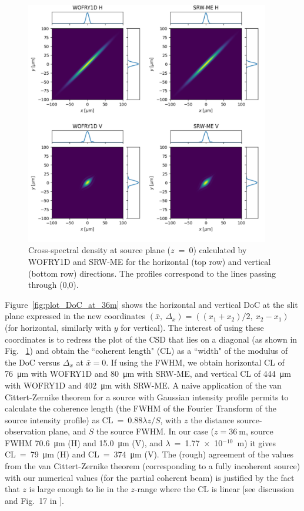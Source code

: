 \documentclass{iucr}              %
\begin{document}
\begin{figure}
    \label{fig:plot_CSD_at_source}
    \includegraphics[width=0.95\textwidth]{figures/plot_CSD_at_source.pdf}
    \caption{Cross-spectral density at source plane ($z$~=~0) calculated by WOFRY1D and SRW-ME for the horizontal (top row) and vertical (bottom row) directions.
    The profiles correspond to the lines passing through (0,0).
    }
\end{figure}

Figure~\ref{fig:plot_DoC_at_36m} shows the horizontal and vertical DoC at the slit plane expressed in the new coordinates $(\bar{x},~\Delta_x) = ((x_1+x_2)\big/2,~x_2-x_1)$ (for horizontal, similarly with $y$ for vertical). The interest of using these coordinates is to redress the plot of the CSD that lies on a diagonal (as shown in Fig. ~\ref{fig:plot_CSD_at_source}) and obtain the ``coherent length" (CL) as a ``width" of the modulus of the DoC versus $\Delta_x$ at $\bar{x}=0$. If using the FWHM, we obtain horizontal CL of \SI{76}{\micro\meter} with WOFRY1D and \SI{80}{\micro\meter} with SRW-ME, and vertical CL of
\SI{444}{\micro\meter} with WOFRY1D and \SI{402}{\micro\meter} with SRW-ME. A naive application of the van Cittert-Zernike theorem for a source with Gaussian intensity profile permits to calculate the coherence length (the FWHM of the Fourier Transform of the source intensity profile) as CL~=~0.88$\lambda z/S$, with $z$ the distance source-observation plane, and $S$ the source FWHM. In our case ($z=\SI{36}{\meter}$, source FWHM \SI{70.6}{\micro\meter} (H) and \SI{15.0}{\micro\meter} (V), and $\lambda$~=~1.77~$\times$~10$^{-10}$~m) it gives CL~=~\SI{79}{\micro\meter} (H) and CL~=~\SI{374}{\micro\meter} (V). The (rough) agreement of the values from the van Cittert-Zernike theorem (corresponding to a fully incoherent source) with our numerical values (for the partial coherent beam) is justified by the fact that $z$ is large enough to lie in the $z$-range where the CL is linear [see discussion and Fig.~17 in \cite{geloni2008}].
\end{document}
